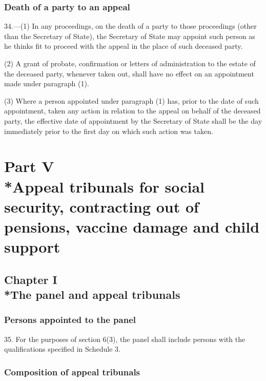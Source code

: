 \documentclass[12pt,a4paper]{article}
\begin{document}
\subsubsection[34. Death of a party to an appeal]{Death of a party to an appeal}

34.—(1) In any proceedings, on the death of a party to those proceedings (other than the Secretary of State), the Secretary of State may appoint such person as he thinks fit to proceed with the appeal in the place of such deceased party.

(2) A grant of probate, confirmation or letters of administration to the estate of the deceased party, whenever taken out, shall have no effect on an appointment made under paragraph (1).

(3) Where a person appointed under paragraph (1) has, prior to the date of such appointment, taken any action in relation to the appeal on behalf of the deceased party, the effective date of appointment by the Secretary of State shall be the day immediately prior to the first day on which such action was taken.

\section[Part V --- Appeal tribunals for social security, contracting out of pensions, vaccine damage and child support]{Part V\\*Appeal tribunals for social security, contracting out of pensions, vaccine damage and child support}

\subsection[Chapter I --- The panel and appeal tribunals]{Chapter I\\*The panel and appeal tribunals}

\subsubsection[35. Persons appointed to the panel]{Persons appointed to the panel}

\renewcommand\parthead{--- Part V Chapter I}

35.  For the purposes of section 6(3), the panel shall include persons with the qualifications specified in Schedule 3.

\subsubsection[36. Composition of appeal tribunals]{Composition of appeal tribunals}
\end{document}
